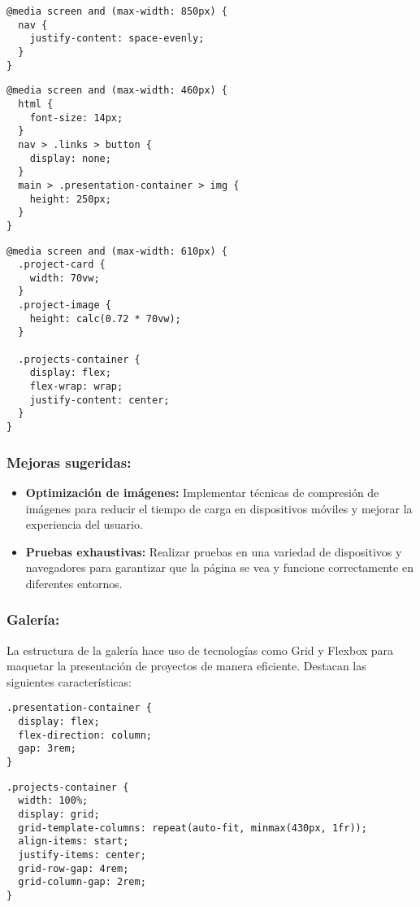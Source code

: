 \begin{verbatim}
@media screen and (max-width: 850px) {
  nav {
    justify-content: space-evenly;
  }
}
\end{verbatim}

\begin{verbatim}
@media screen and (max-width: 460px) {
  html {
    font-size: 14px;
  }
  nav > .links > button {
    display: none;
  }
  main > .presentation-container > img {
    height: 250px;
  }
}
\end{verbatim}

\begin{verbatim}
@media screen and (max-width: 610px) {
  .project-card {
    width: 70vw;
  }
  .project-image {
    height: calc(0.72 * 70vw);
  }

  .projects-container {
    display: flex;
    flex-wrap: wrap;
    justify-content: center;
  }
}
\end{verbatim}

\subsubsection{Mejoras sugeridas:}

\begin{itemize}
    \item \textbf{Optimización de imágenes:} Implementar técnicas de compresión de imágenes para reducir el tiempo de carga en dispositivos móviles y mejorar la experiencia del usuario.
    \item \textbf{Pruebas exhaustivas:} Realizar pruebas en una variedad de dispositivos y navegadores para garantizar que la página se vea y funcione correctamente en diferentes entornos.
\end{itemize}

\subsubsection{Galería:}

La estructura de la galería hace uso de tecnologías como Grid y Flexbox para maquetar la presentación de proyectos de manera eficiente. Destacan las siguientes características:

\begin{verbatim}
.presentation-container {
  display: flex;
  flex-direction: column;
  gap: 3rem;
}
\end{verbatim}

\begin{verbatim}
.projects-container {
  width: 100%;
  display: grid;
  grid-template-columns: repeat(auto-fit, minmax(430px, 1fr));
  align-items: start;
  justify-items: center;
  grid-row-gap: 4rem;
  grid-column-gap: 2rem;
}
\end{verbatim}
